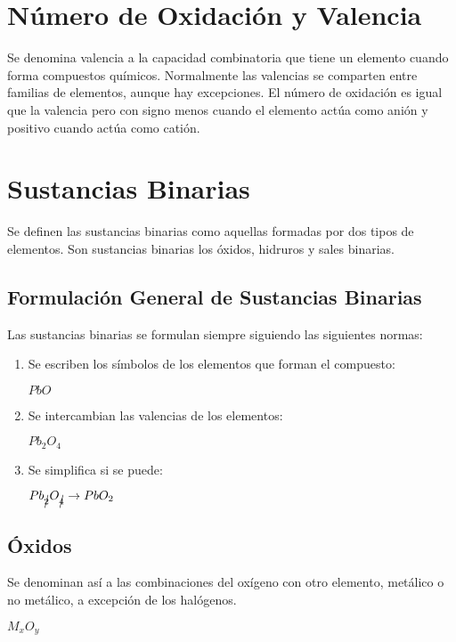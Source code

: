 \section{Número de Oxidación y Valencia}
	Se denomina valencia a la capacidad combinatoria que tiene un elemento cuando forma compuestos químicos. Normalmente las valencias se comparten entre familias de elementos, aunque  hay excepciones. El número de oxidación es igual que la valencia pero con signo menos cuando el elemento actúa como anión y positivo cuando actúa como catión.
\section{Sustancias Binarias}
	Se definen las sustancias binarias como aquellas formadas por dos tipos de elementos. Son sustancias binarias los óxidos, hidruros y sales binarias.

\subsection{Formulación General de Sustancias Binarias}
	Las sustancias binarias se formulan siempre siguiendo las siguientes normas:\\
\begin{enumerate}
	\item Se escriben los símbolos de los elementos que forman el compuesto:\\
\begin{center}
		$PbO$
\end{center}
		\item Se intercambian las valencias de los elementos:\\
\begin{center}
	$Pb_{2}O_4$
\end{center}
		\item Se simplifica si se puede:\\
\begin{center}
	$Pb_{\cancel{2}}O_{\cancel{4}} \rightarrow PbO_2$
\end{center}
\end{enumerate}
\subsection {Óxidos}
Se denominan así a las combinaciones del oxígeno con otro elemento, metálico o no metálico, a excepción de los halógenos.\\

\begin{center}
	$M_{x}O_y$
\end{center}

